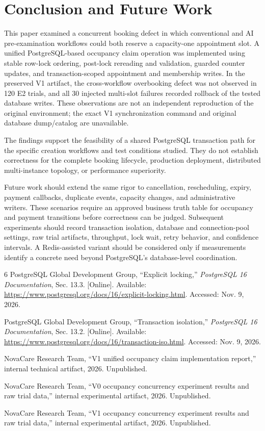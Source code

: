 \documentclass[conference]{IEEEtran}
\begin{document}
\section{Conclusion and Future Work}
This paper examined a concurrent booking defect in which conventional and AI pre-examination workflows could both reserve a capacity-one appointment slot. A unified PostgreSQL-based occupancy claim operation was implemented using stable row-lock ordering, post-lock rereading and validation, guarded counter updates, and transaction-scoped appointment and membership writes. In the preserved V1 artifact, the cross-workflow overbooking defect was not observed in 120 E2 trials, and all 30 injected multi-slot failures recorded rollback of the tested database writes. These observations are not an independent reproduction of the original environment; the exact V1 synchronization command and original database dump/catalog are unavailable.

The findings support the feasibility of a shared PostgreSQL transaction path for the specific creation workflows and test conditions studied. They do not establish correctness for the complete booking lifecycle, production deployment, distributed multi-instance topology, or performance superiority.

Future work should extend the same rigor to cancellation, rescheduling, expiry, payment callbacks, duplicate events, capacity changes, and administrative writers. These scenarios require an approved business truth table for occupancy and payment transitions before correctness can be judged. Subsequent experiments should record transaction isolation, database and connection-pool settings, raw trial artifacts, throughput, lock wait, retry behavior, and confidence intervals. A Redis-assisted variant should be considered only if measurements identify a concrete need beyond PostgreSQL's database-level coordination.

\balance
\balance
\begin{thebibliography}{6}
PostgreSQL Global Development Group, ``Explicit locking,'' \emph{PostgreSQL 16 Documentation}, Sec. 13.3. [Online]. Available: \url{https://www.postgresql.org/docs/16/explicit-locking.html}. Accessed: Nov. 9, 2026.

PostgreSQL Global Development Group, ``Transaction isolation,'' \emph{PostgreSQL 16 Documentation}, Sec. 13.2. [Online]. Available: \url{https://www.postgresql.org/docs/16/transaction-iso.html}. Accessed: Nov. 9, 2026.

NovaCare Research Team, ``V1 unified occupancy claim implementation report,'' internal technical artifact, 2026. Unpublished.

NovaCare Research Team, ``V0 occupancy concurrency experiment results and raw trial data,'' internal experimental artifact, 2026. Unpublished.

NovaCare Research Team, ``V1 occupancy concurrency experiment results and raw trial data,'' internal experimental artifact, 2026. Unpublished.
\end{thebibliography}
\end{document}
